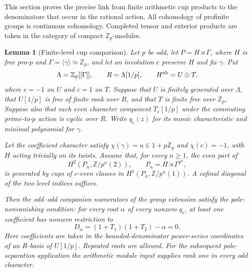 \documentclass[11pt]{article}
\newtheorem{lemma}[theorem]{Lemma}
\theoremstyle{definition}
\numberwithin{equation}{section}
\begin{document}
This section proves the precise link from finite arithmetic cup products
to the denominators that occur in the rational action. All cohomology
of profinite groups is continuous cohomology. Completed tensor and
exterior products are taken in the category of compact
$\mathbb Z_p$-modules.
\begin{lemma}[Finite-level cup comparison]\label{lem:cup-pole-bridge}
Let $p$ be odd, let $P=H\rtimes\Gamma$, where $H$ is free pro-$p$
and $\Gamma=\langle\gamma\rangle\simeq\mathbb Z_p$, and let an
involution $c$ preserve $H$ and fix $\gamma$. Put
\begin{equation}
 \Lambda=\mathbb Z_p[[\Gamma]],\qquad R=\Lambda[1/p],\qquad
 H^{\rm ab}=U\oplus T,
\end{equation}
where $c=-1$ on $U$ and $c=1$ on $T$. Suppose that $U$ is finitely
generated over $\Lambda$, that $U[1/p]$ is free of finite rank over
$R$, and that $T$ is finite free over $\mathbb Z_p$. Suppose also
that each even character component $T_e[1/p]$ under the commuting
prime-to-$p$ action is cyclic over $R$. Write $q_e(z)$ for its monic
characteristic and minimal polynomial for $\gamma$.

Let the coefficient character satisfy $\chi(\gamma)=u\in1+p\mathbb Z_p$
and $\chi(c)=-1$, with $H$ acting trivially on its twists. Assume that,
for every $n\geq1$, the even part of
\begin{equation}
 H^2(P_n,\mathbb Z/p^n(2)),\qquad
 P_n=H\rtimes\Gamma^{p^n},
\end{equation}
is generated by cups of $c$-even classes in
$H^1(P_n,\mathbb Z/p^n(1))$. A cofinal diagonal of the two level
indices suffices.

Then the odd--odd companion numerators of the group extension satisfy the
pole-nonvanishing condition: for every root $\alpha$ of every
nonzero $q_e$, at least one coefficient has nonzero restriction to
\begin{equation}
 D_\alpha=(1+T_1)(1+T_2)-\alpha=0.
                                                               \label{eq:ce1}
\end{equation}
Here coefficients are taken in the bounded-denominator power-series
coordinates of an $R$-basis of $U[1/p]$. Repeated roots are allowed.
For the subsequent pole-separation application the arithmetic module
input supplies rank one in every odd character.
\end{lemma}
\end{document}
